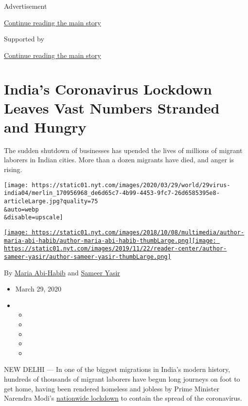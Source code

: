 Advertisement

\protect\hyperlink{after-top}{Continue reading the main story}

Supported by

\protect\hyperlink{after-sponsor}{Continue reading the main story}

\hypertarget{indias-coronavirus-lockdown-leaves-vast-numbers-stranded-and-hungry}{%
\section{India's Coronavirus Lockdown Leaves Vast Numbers Stranded and
Hungry}\label{indias-coronavirus-lockdown-leaves-vast-numbers-stranded-and-hungry}}

The sudden shutdown of businesses has upended the lives of millions of
migrant laborers in Indian cities. More than a dozen migrants have died,
and anger is rising.

\texttt{[image: https://static01.nyt.com/images/2020/03/29/world/29virus-india04/merlin\_170956968\_de6d65c7-4b99-4453-9fc7-26d6585395e8-articleLarge.jpg?quality=75\\\&auto=webp\\\&disable=upscale]}

\href{https://www.nytimes.com/by/maria-abi-habib}{\texttt{[image: https://static01.nyt.com/images/2018/10/08/multimedia/author-maria-abi-habib/author-maria-abi-habib-thumbLarge.png]}}\href{https://www.nytimes.com/by/sameer-yasir}{\texttt{[image: https://static01.nyt.com/images/2019/11/22/reader-center/author-sameer-yasir/author-sameer-yasir-thumbLarge.png]}}

By \href{https://www.nytimes.com/by/maria-abi-habib}{Maria Abi-Habib}
and \href{https://www.nytimes.com/by/sameer-yasir}{Sameer Yasir}

\begin{itemize}
\item
  March 29, 2020
\item
  \begin{itemize}
  \item
  \item
  \item
  \item
  \item
  \end{itemize}
\end{itemize}

NEW DELHI --- In one of the biggest migrations in India's modern
history, hundreds of thousands of migrant laborers have begun long
journeys on foot to get home, having been rendered homeless and jobless
by Prime Minister Narendra Modi's
\href{https://www.nytimes.com/2020/03/24/world/asia/india-coronavirus-lockdown.html}{nationwide
lockdown} to contain the spread of the coronavirus.

